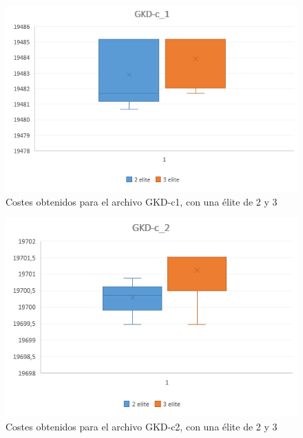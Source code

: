 	
	\begin{figure}[H]
		
		\centering
		\includegraphics[scale=0.7]{img/MPX_2vs3/GKD-c_1_Costes}
		\caption{Costes obtenidos para el archivo GKD-c1, con una élite de 2 y 3}
		\label{gkd-c1_coste}
	\end{figure}
	\begin{figure}[H]
		\centering
		\includegraphics[scale=0.7]{img/MPX_2vs3/GKD-c_2_Costes}
		\caption{Costes obtenidos para el archivo GKD-c2, con una élite de 2 y 3}
		\label{gkd-c2_coste}
		
	\end{figure}
